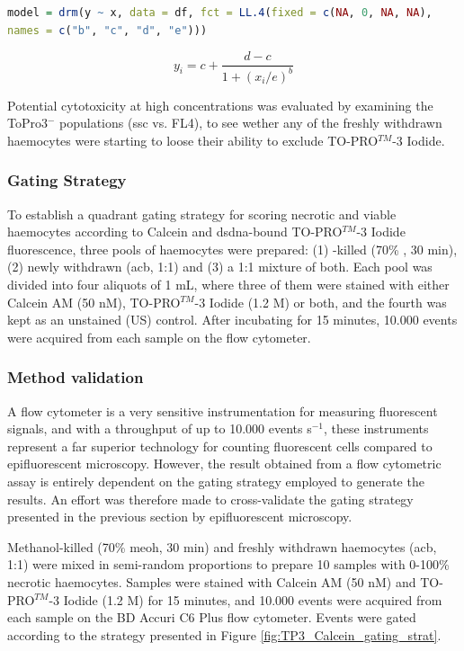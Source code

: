 \begin{lstlisting}[language=R, caption = {The R source code run to fit the four-parameter log-logistic regression model in RStudio.}]
model = drm(y ~ x, data = df, fct = LL.4(fixed = c(NA, 0, NA, NA), 
names = c("b", "c", "d", "e")))
\end{lstlisting}

\begin{equation}
\label{eq:LL4}
y_{i} = c + \dfrac{d-c}{1 + (x_i / e)^b}
\end{equation}

Potential cytotoxicity at high concentrations was evaluated by examining the ToPro3$^{-}$ populations (\acrshort{ssc} vs. FL4), to see wether any of the freshly withdrawn haemocytes were starting to loose their ability to exclude TO-PRO$^{TM}$-3 Iodide.

\subsubsection{Gating Strategy}
\label{subsubsection: gating validation}
To establish a quadrant gating strategy for scoring necrotic and viable haemocytes according to Calcein and \acrshort{dsdna}-bound TO-PRO$^{TM}$-3 Iodide fluorescence, three pools of haemocytes were prepared: (1) -killed (70\% , 30 min), (2) newly withdrawn (\acrshort{acb}, 1:1) and (3) a 1:1 mixture of both. Each pool was divided into four aliquots of 1 mL, where three of them were stained with either Calcein AM (50 nM), TO-PRO$^{TM}$-3 Iodide (1.2 \micro M) or both, and the fourth was kept as an unstained (US) control. After incubating for 15 minutes, 10.000 events were acquired from each sample on the flow cytometer.

\subsubsection{Method validation}
A flow cytometer is a very sensitive instrumentation for measuring fluorescent signals, and with a throughput of up to 10.000 events s$^{-1}$, these instruments represent a far superior technology for counting fluorescent cells compared to epifluorescent microscopy. However, the result obtained from a flow cytometric assay is entirely dependent on the gating strategy employed to generate the results. An effort was therefore made to cross-validate the gating strategy presented in the previous section by epifluorescent microscopy.

Methanol-killed (70\% \acrshort{meoh}, 30 min) and freshly withdrawn haemocytes (\acrshort{acb}, 1:1) were mixed in semi-random proportions to prepare 10 samples with 0-100\% necrotic haemocytes. Samples were stained with Calcein AM (50 nM) and TO-PRO$^{TM}$-3 Iodide (1.2 \micro M) for 15 minutes, and 10.000 events were acquired from each sample on the BD Accuri C6 Plus flow cytometer. Events were gated according to the strategy presented in Figure \ref{fig:TP3_Calcein_gating_strat}.

